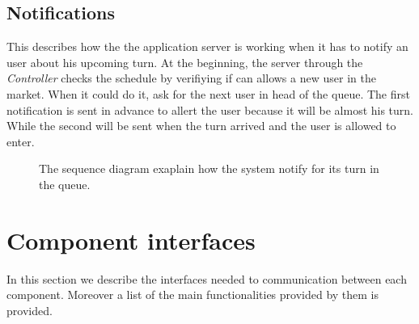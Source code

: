 \subsection{Notifications}
This describes how the the application server is working when it has to notify an user about his upcoming turn. At the beginning, the server through the \textit{Controller} checks the schedule by verifiying if can allows a new user in the market. When it could do it, ask for the next user in head of the queue. The first notification is sent in advance to allert the user because it will be almost his turn. While the second will be sent when the turn arrived and the user is allowed to enter. 

\begin{figure}[H]
  \label{NotificationsSD}
  \centering
    \caption{The sequence diagram exaplain how the system notify for its turn in the queue.}
\end{figure} 








\section{Component interfaces}
In this section we describe the interfaces needed to communication between each component. Moreover a list of the main functionalities provided by them is provided.

